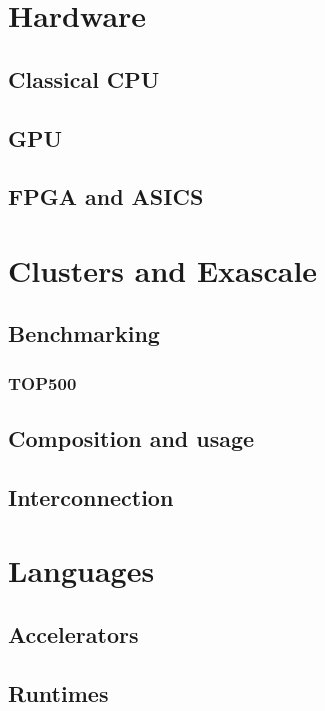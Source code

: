 \section{Hardware}

\subsection{Classical CPU}

\subsection{GPU}

\subsection{FPGA and ASICS}

\section{Clusters and Exascale}

\subsection{Benchmarking}

\subsubsection{TOP500}

\subsection{Composition and usage}

\subsection{Interconnection}

\section{Languages}

\subsection{Accelerators}

\subsection{Runtimes}


